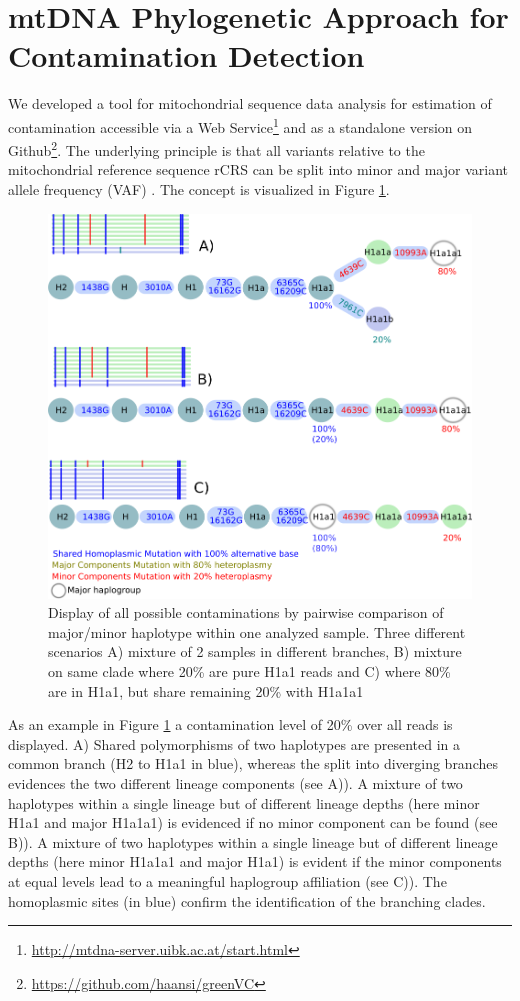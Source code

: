 \section{mtDNA Phylogenetic Approach for Contamination Detection}\label{haplochecker}
We developed a tool for mitochondrial sequence data analysis for estimation of contamination accessible via a Web Service\footnote{\url{http://mtdna-server.uibk.ac.at/start.html}} and as a standalone version on Github\footnote{\url{https://github.com/haansi/greenVC}}. The underlying principle is that all variants relative to the mitochondrial reference sequence rCRS \cite{Andrews1999} can be split into minor and major variant allele frequency (VAF) \cite{Li2010, Avital2012}. The concept is visualized in Figure \ref{fig-concept-cont}. 
\begin{figure}[!ht]
    \centering
    \includegraphics[width=1\textwidth]{images/heteroplasmy.png}
    \caption[Display of all possible pairwise sample contamination]{Display of all possible contaminations by pairwise comparison of major/minor haplotype within one analyzed sample. Three different scenarios A) mixture of 2 samples in different branches, B) mixture on same clade where 20\% are pure H1a1 reads and C) where 80\% are in H1a1, but share remaining 20\% with H1a1a1 } 
    \label{fig-concept-cont}
\end{figure}

As an example in Figure \ref{fig-concept-cont} a contamination level of 20\% over all reads is displayed. A) Shared polymorphisms of two haplotypes are presented in a common branch (H2 to H1a1 in blue), whereas the split into diverging branches evidences the two different lineage components (see A)). A mixture of two haplotypes within a single lineage but of different lineage depths (here minor H1a1 and major H1a1a1) is evidenced if no minor component can be found  (see B)). A mixture of two haplotypes within a single lineage but of different lineage depths (here minor H1a1a1 and major H1a1) is evident if the minor components at equal levels lead to a meaningful haplogroup affiliation  (see C)). The homoplasmic sites (in blue) confirm the identification of the branching clades.

